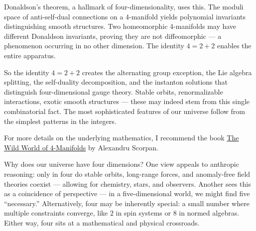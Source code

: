 Donaldson's theorem, a hallmark of four-dimensionality, uses this. The moduli space of anti-self-dual connections on a 4-manifold yields polynomial invariants distinguishing smooth structures. Two homeomorphic 4-manifolds may have different Donaldson invariants, proving they are not diffeomorphic — a phenomenon occurring in no other dimension. The identity $4 = 2 + 2$ enables the entire apparatus.

So the identity $4 = 2 + 2$ creates the alternating group exception, the Lie algebra splitting, the self-duality decomposition, and the instanton solutions that distinguish four-dimensional gauge theory. Stable orbits, renormalizable interactions, exotic smooth structures — these may indeed stem from this single combinatorial fact. The most sophisticated features of our universe follow from the simplest patterns in the integers.

For more details on the underlying mathematics, I recommend the book \href{https://bookstore.ams.org/FOURMAN}{The Wild World of 4-Manifolds} by Alexandru Scorpan.

\begin{commentary}
Why does our universe have four dimensions? One view appeals to anthropic reasoning: only in four do stable orbits, long-range forces, and anomaly-free field theories coexist — allowing for chemistry, stars, and observers. Another sees this as a coincidence of perspective — in a five-dimensional world, we might find five “necessary.” Alternatively, four may be inherently special: a small number where multiple constraints converge, like $2$ in spin systems or $8$ in normed algebras. Either way, four sits at a mathematical and physical crossroads.
\end{commentary}

